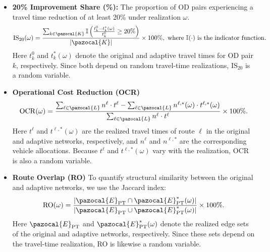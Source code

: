 \documentclass[a4paper,fleqn]{cas-sc}
\begin{document}
\begin{itemize}
    \item \textbf{20\% Improvement Share (\%):} The proportion of OD pairs experiencing a travel time reduction of at least 20\% under realization $\omega$.
    \begin{align}
        \text{IS$_{20}$}(\omega) = \frac{\sum_{k \in \pazocal{K}} \mathbb{I} \left( \frac{t_k^0 - t_k^*(\omega)}{t_k^0} \geq 20\% \right)}{|\pazocal{K}|} \times 100\%, \text{ where } \mathbb{I}(\cdot) \text{ is the indicator function.}\nonumber
    \end{align}
    Here $t_k^0$ and $t_k^*(\omega)$ denote the original and adaptive travel times for OD pair $k$, respectively. Since both depend on random travel-time realizations, $\text{IS$_{20}$}$ is a random variable.
    
    \item \textbf{Operational Cost Reduction (OCR)}  
        \[
            \mathrm{OCR}(\omega)
            =
            \frac{\sum_{\ell \in \pazocal{L}} n^\ell \cdot t^\ell
                  -
                  \sum_{\ell \in \pazocal{L}} n^{\ell,*}(\omega) \cdot t^{\ell,*}(\omega)}
                 {\sum_{\ell \in \pazocal{L}} n^\ell \cdot t^\ell}
            \times 100\%.
        \]
    Here  
    $t^\ell$ and $t^{\ell,*}(\omega)$ are the realized travel times of route $\ell$ in the original and adaptive networks, respectively,  
    and  
    $n^\ell$ and $n^{\ell,*}$ are the corresponding vehicle allocations.  
    Because $t^\ell$ and $t^{\ell,*}(\omega)$ vary with the realization, OCR is also a random variable.
    
    \item \textbf{Route Overlap (RO)}  
    To quantify structural similarity between the original and adaptive networks, we use the Jaccard index:
    \[
        \mathrm{RO}(\omega)
        =
        \frac{\lvert \pazocal{E}_{\mathrm{PT}}
                 \cap
                 \pazocal{E}_{\mathrm{PT}}^*(\omega)\rvert}
             {\lvert \pazocal{E}_{\mathrm{PT}}
                 \cup
                 \pazocal{E}_{\mathrm{PT}}^*(\omega)\rvert}
        \times 100\%.
    \]
    Here $\pazocal{E}_{\mathrm{PT}}$ and $\pazocal{E}_{\mathrm{PT}}^*(\omega)$ denote the realized edge sets of the original and adaptive networks, respectively.  
    Since these sets depend on the travel-time realization, RO is likewise a random variable.

\end{itemize}
\end{document}
